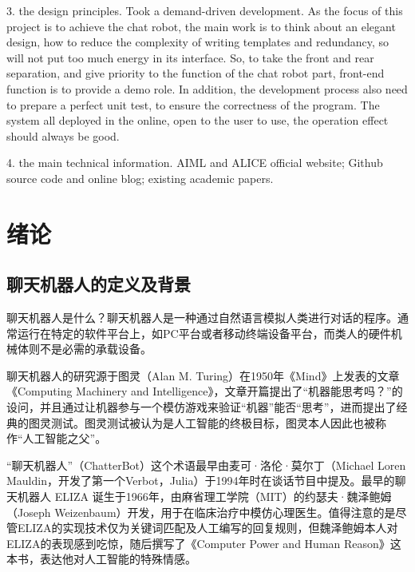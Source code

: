 \documentclass[bachelor,winfonts]{jnuthesis}
\begin{document}
\begin{englishabstract}
3. the design principles. Took a demand-driven development. As the focus of this project is to achieve the chat robot, the main work is to think about an elegant design, how to reduce the complexity of writing templates and redundancy, so will not put too much energy in its interface. So, to take the front and rear separation, and give priority to the function of the chat robot part, front-end function is to provide a demo role. In addition, the development process also need to prepare a perfect unit test, to ensure the correctness of the program. The system all deployed in the online, open to the user to use, the operation effect should always be good.

4. the main technical information. AIML and ALICE official website; Github source code and online blog; existing academic papers.

\end{englishabstract}

\tableofcontents

\mainmatter

\chapter{绪论}\label{chapter_introduction}
\section{聊天机器人的定义及背景}
聊天机器人是什么？聊天机器人是一种通过自然语言模拟人类进行对话的程序。通常运行在特定的软件平台上，如PC平台或者移动终端设备平台，而类人的硬件机械体则不是必需的承载设备。

聊天机器人的研究源于图灵（Alan M. Turing）在1950年《Mind》上发表的文章《Computing Machinery and Intelligence》，文章开篇提出了“机器能思考吗？”的设问，并且通过让机器参与一个模仿游戏来验证“机器”能否“思考”，进而提出了经典的图灵测试。图灵测试被认为是人工智能的终极目标，图灵本人因此也被称作“人工智能之父”。

“聊天机器人”（ChatterBot）这个术语最早由麦可·洛伦·莫尔丁（Michael Loren Mauldin，开发了第一个Verbot，Julia）于1994年时在谈话节目中提及。最早的聊天机器人 ELIZA 诞生于1966年，由麻省理工学院（MIT）的约瑟夫·魏泽鲍姆（Joseph Weizenbaum）开发，用于在临床治疗中模仿心理医生。值得注意的是尽管ELIZA的实现技术仅为关键词匹配及人工编写的回复规则，但魏泽鲍姆本人对ELIZA的表现感到吃惊，随后撰写了《Computer Power and Human Reason》这本书，表达他对人工智能的特殊情感。
\end{document}

